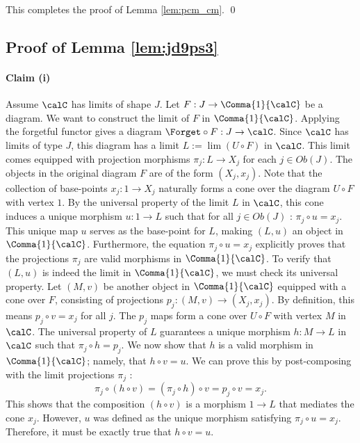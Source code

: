 \documentclass[12pt,oneside,pb-diagram]{article}
\begin{document}
This completes the proof of Lemma \ref{lem:pcm_cm}. \qed
\subsection{Proof of Lemma \ref{lem:jd9ps3}} \label{sec:proof:jd9ps3}

\paragraph{Claim (i)} Assume $\calC$ has limits of shape $J$. Let $F: J \to \Comma{1}{\calC}$ be a diagram. We want to construct the limit of $F$ in $\Comma{1}{\calC}$. Applying the forgetful functor gives a diagram $\Forget \circ F: J \to \calC$. Since $\calC$ has limits of type $J$, this diagram has a limit $L := \lim(U \circ F)$ in $\calC$. This limit comes equipped with projection morphisms $\pi_j: L \to X_j$ for each $j \in Ob(J)$. The objects in the original diagram $F$ are of the form $(X_j, x_j)$. Note that the collection of base-points $x_j: 1 \to X_j$ naturally forms a cone over the diagram $U \circ F$ with vertex $1$. By the universal property of the limit $L$ in $\calC$, this cone induces a unique morphism $u: 1 \to L$ such that for all $j \in Ob(J)$ : $ \pi_j \circ u = x_j$. This unique map $u$ serves as the base-point for $L$, making $(L, u)$ an object in $\Comma{1}{\calC}$. Furthermore, the equation $\pi_j \circ u = x_j$ explicitly proves that the projections $\pi_j$ are valid morphisms in $\Comma{1}{\calC}$. To verify that $(L, u)$ is indeed the limit in $\Comma{1}{\calC}$, we must check its universal property. Let $(M, v)$ be another object in $\Comma{1}{\calC}$ equipped with a cone over $F$, consisting of projections $p_j: (M, v) \to (X_j, x_j)$. By definition, this means $p_j \circ v = x_j$ for all $j$. The $p_j$ maps form a cone over $U \circ F$ with vertex $M$ in $\calC$. The universal property of $L$ guarantees a unique morphism $h: M \to L$ in $\calC$ such that $\pi_j \circ h = p_j$. We now show that $h$ is a valid morphism in $\Comma{1}{\calC}$; namely, that $h \circ v = u$. We can prove this by post-composing with the limit projections $\pi_j$ : 
\[\pi_j \circ (h \circ v) = (\pi_j \circ h) \circ v = p_j \circ v = x_j.\]
This shows that the composition $(h \circ v)$ is a morphism $1 \to L$ that mediates the cone $x_j$. However, $u$ was defined as the unique morphism satisfying $\pi_j \circ u = x_j$. Therefore, it must be exactly true that $ h \circ v = u $.
\end{document}
